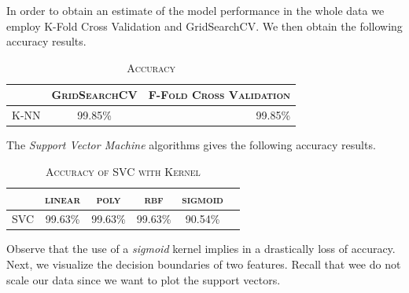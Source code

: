 \documentclass[a4paper,11pt]{amsart}
\begin{document}
\medbreak

In order to obtain an estimate of the model performance in the whole data we employ K-Fold Cross Validation and GridSearchCV. We then obtain the following accuracy results.
\begin{table}[h!]
  \begin{center}
    \caption{\textsc{Accuracy}}
    \label{tab:table3}
    \begin{tabular}{l|c|r|} 
      & \textsc{GridSearchCV}  & \textsc{F-Fold Cross Validation}\\
      \hline
      \textsc{K-NN}& 99.85\% & 99.85\%\\
    \end{tabular}
  \end{center}
\end{table}

\medbreak

The \emph{Support Vector Machine} algorithms gives the following accuracy results.
\begin{table}[h!]
  \begin{center}
    \caption{\textsc{Accuracy of SVC with Kernel}}
    \label{tab:table4}
    \begin{tabular}{l|c|c|c|c|r|} 
      & \textsc{linear}  & \textsc{poly} & \textsc{rbf} & \textsc{sigmoid}\\
      \hline
      \textsc{SVC}& 99.63\% & 99.63\% & 99.63\% & 90.54\%\\
    \end{tabular}
  \end{center}
\end{table}

Observe that the use of a \emph{sigmoid} kernel implies in a drastically loss of accuracy. Next, we visualize the decision boundaries of two features. Recall that wee do not scale our data since we want to plot the support vectors.

\pagebreak
\end{document}
